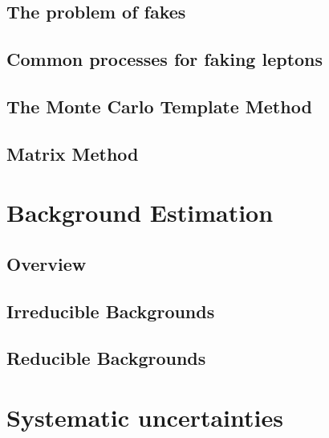 \documentclass{outhesis}
\begin{document}
\section{The problem of fakes}\label{sec:fake.prob}

\section{Common processes for faking leptons}\label{sec:fake.proc}

\section{The Monte Carlo Template Method}\label{sec:fake.mct}

\section{Matrix Method}\label{sec:fake.mxm}


\chapter{Background Estimation}\label{chap:bkg}
\graphicspath{{figures/bkg/}}
\section{Overview}\label{sec:bkg.overview}

\section{Irreducible Backgrounds}\label{sec:bkg.irred}

\section{Reducible Backgrounds}\label{sec:bkg.red}


\chapter{Systematic uncertainties}\label{chap:syst}
\graphicspath{{figures/syst/}}
\end{document}
